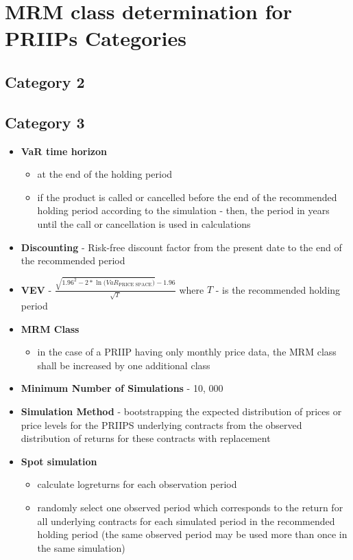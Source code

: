 \section{MRM class determination for PRIIPs Categories}

\subsection{Category 2}

\subsection{Category 3}

\begin{itemize}
	\item \textbf{VaR time horizon}
	\begin{itemize}
		\item at the end of the holding period
		\item if the product is
		called or cancelled before the end of the recommended holding period according to the simulation - then, the period in years until the call or cancellation is used in calculations
	\end{itemize}
	\item \textbf{Discounting} - Risk-free discount factor from the present date to the end of the recommended period
	\item \textbf{VEV} - $\frac{\sqrt{1.96^{2} - 2 * \ln{\Big(VaR_{\text{PRICE SPACE}}\Big)}} - 1.96}{\sqrt{T}}$ where $T$ - is the recommended holding period
	\item \textbf{MRM Class}
	\begin{itemize}
		\item in the case of a PRIIP having only monthly price data, the MRM class shall be increased by one additional class 
	\end{itemize}
	\item \textbf{Minimum Number of Simulations} - 10, 000
	\item \textbf{Simulation Method} - bootstrapping the expected distribution of prices or price levels for the PRIIPS underlying contracts from the observed distribution of returns for these contracts with replacement
	\item \textbf{Spot simulation}
	\begin{itemize}
		\item calculate logreturns for each observation period
		\item randomly select one observed period which corresponds to the return for all underlying contracts for each simulated period in the recommended holding period (the same observed period may be used more than once in the same simulation)

\end{itemize}
\end{itemize}
